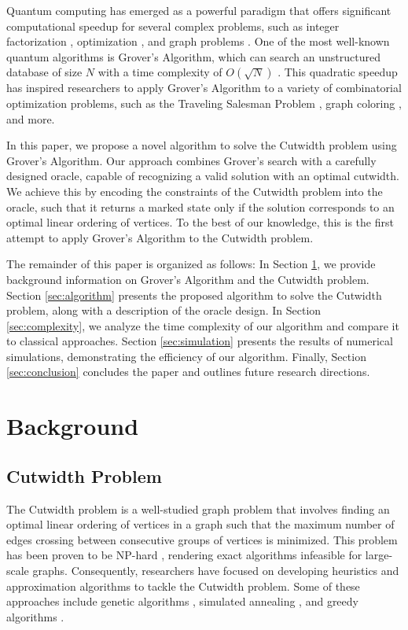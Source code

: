 Quantum computing has emerged as a powerful paradigm that offers significant computational speedup for several complex problems, such as integer factorization \cite{shor}, optimization \cite{grover}, and graph problems \cite{graph}. One of the most well-known quantum algorithms is Grover's Algorithm, which can search an unstructured database of size $N$ with a time complexity of $O(\sqrt{N})$ \cite{grover_original}. This quadratic speedup has inspired researchers to apply Grover's Algorithm to a variety of combinatorial optimization problems, such as the Traveling Salesman Problem \cite{tsp}, graph coloring \cite{graph_coloring}, and more.

In this paper, we propose a novel algorithm to solve the Cutwidth problem using Grover's Algorithm. Our approach combines Grover's search with a carefully designed oracle, capable of recognizing a valid solution with an optimal cutwidth. We achieve this by encoding the constraints of the Cutwidth problem into the oracle, such that it returns a marked state only if the solution corresponds to an optimal linear ordering of vertices. To the best of our knowledge, this is the first attempt to apply Grover's Algorithm to the Cutwidth problem.

The remainder of this paper is organized as follows: In Section \ref{sec:background}, we provide background information on Grover's Algorithm and the Cutwidth problem. Section \ref{sec:algorithm} presents the proposed algorithm to solve the Cutwidth problem, along with a description of the oracle design. In Section \ref{sec:complexity}, we analyze the time complexity of our algorithm and compare it to classical approaches. Section \ref{sec:simulation} presents the results of numerical simulations, demonstrating the efficiency of our algorithm. Finally, Section \ref{sec:conclusion} concludes the paper and outlines future research directions.

\section{Background}
\label{sec:background}

\subsection{Cutwidth Problem}

The Cutwidth problem is a well-studied graph problem that involves finding an optimal linear ordering of vertices in a graph such that the maximum number of edges crossing between consecutive groups of vertices is minimized. This problem has been proven to be NP-hard \cite{nphard}, rendering exact algorithms infeasible for large-scale graphs. Consequently, researchers have focused on developing heuristics and approximation algorithms to tackle the Cutwidth problem. Some of these approaches include genetic algorithms \cite{genetic}, simulated annealing \cite{simulated_annealing}, and greedy algorithms \cite{greedy}.

